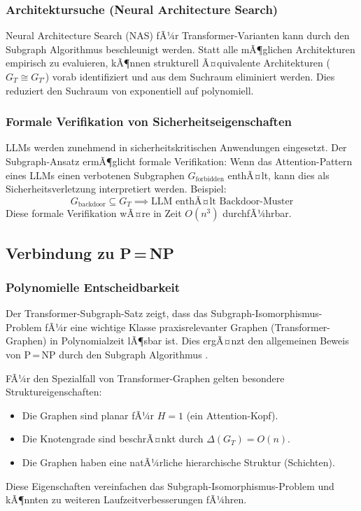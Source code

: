 ﻿\documentclass[a4paper,12pt]{article}
\theoremstyle{definition}
\begin{document}
\subsubsection{Architektursuche (Neural Architecture Search)}

Neural Architecture Search (NAS) fÃ¼r Transformer-Varianten kann durch
den Subgraph Algorithmus beschleunigt werden. Statt alle mÃ¶glichen
Architekturen empirisch zu evaluieren, kÃ¶nnen strukturell Ã¤quivalente
Architekturen ($G_T \cong G_{T'}$) vorab identifiziert und aus dem
Suchraum eliminiert werden. Dies reduziert den Suchraum von exponentiell
auf polynomiell.

\subsubsection{Formale Verifikation von Sicherheitseigenschaften}

LLMs werden zunehmend in sicherheitskritischen Anwendungen eingesetzt.
Der Subgraph-Ansatz ermÃ¶glicht formale Verifikation: Wenn das Attention-Pattern
eines LLMs einen verbotenen Subgraphen $G_{\mathrm{forbidden}}$ enthÃ¤lt,
kann dies als Sicherheitsverletzung interpretiert werden. Beispiel:
\[
G_{\mathrm{backdoor}} \subseteq G_T \implies \text{LLM enthÃ¤lt Backdoor-Muster}
\]
Diese formale Verifikation wÃ¤re in Zeit $O(n^3)$ durchfÃ¼hrbar.

\subsection{Verbindung zu P\,=\,NP}

\subsubsection{Polynomielle Entscheidbarkeit}

Der Transformer-Subgraph-Satz zeigt, dass das Subgraph-Isomorphismus-Problem
fÃ¼r eine wichtige Klasse praxisrelevanter Graphen (Transformer-Graphen) in
Polynomialzeit lÃ¶sbar ist. Dies ergÃ¤nzt den allgemeinen Beweis von P\,=\,NP
durch den Subgraph Algorithmus \cite{epp2026subgraph,epp2026pnp}.

FÃ¼r den Spezialfall von Transformer-Graphen gelten besondere Struktureigenschaften:
\begin{itemize}
	\item Die Graphen sind planar fÃ¼r $H = 1$ (ein Attention-Kopf).
	\item Die Knotengrade sind beschrÃ¤nkt durch $\Delta(G_T) = O(n)$.
	\item Die Graphen haben eine natÃ¼rliche hierarchische Struktur (Schichten).
\end{itemize}
Diese Eigenschaften vereinfachen das Subgraph-Isomorphismus-Problem
und kÃ¶nnten zu weiteren Laufzeitverbesserungen fÃ¼hren.
\end{document}
